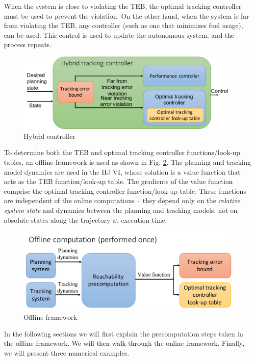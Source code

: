 When the system is close to violating the TEB, the optimal tracking controller must be used to prevent the violation. 
On the other hand, when the system is far from violating the TEB, any controller (such as one that minimizes fuel usage), can be used. 
This control is used to update the autonomous system, and the process repeats.

\begin{figure}[h!]
  \centering
	\includegraphics[width=\columnwidth]{fig/hybrid_controller}
	\caption{Hybrid controller}
	\label{fig:hybrid_ctrl}
\end{figure}

To determine both the TEB and optimal tracking controller functions/look-up tables, an offline framework is used as shown in Fig. \ref{fig:fw_offline}. 
The planning and tracking model dynamics are used in the HJ VI, whose solution is a value function that acts as the TEB function/look-up table. 
The gradients of the value function comprise the optimal tracking controller function/look-up table. 
These functions are independent of the online computations -- they depend only on the \textit{relative system state} and dynamics between the planning and tracking models, not on absolute states along the trajectory at execution time.

\begin{figure}[h!]
  \centering
	\includegraphics[width=0.9\columnwidth]{fig/framework_offline}
	\caption{Offline framework}
	\label{fig:fw_offline}
\end{figure}
In the following sections we will first explain the precomputation steps taken in the offline framework. 
We will then walk through the online framework.
Finally, we will present three numerical examples.

